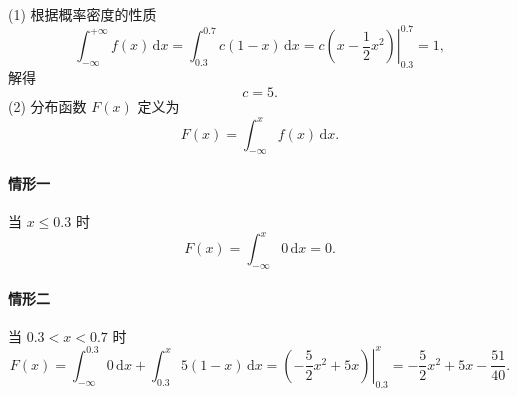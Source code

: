 \begin{solution}
    (1) 根据概率密度的性质
    $$
        \int_{-\infty}^{+\infty} f(x) \,\mathrm{d}x
        = \int_{0.3}^{0.7} c(1-x) \,\mathrm{d}x
        = \left.c\left(x-\frac{1}{2}x^2\right)\right|_{0.3}^{0.7}
        = 1,
    $$
    解得
    $$
        c = 5.
    $$
    (2) 分布函数 $F(x)$ 定义为
    $$
        F(x) = \int_{-\infty}^{x} f(x) \,\mathrm{d}x.
    $$
    \paragraph{情形一} 当 $x \leqslant 0.3$ 时
    $$
        F(x) = \int_{-\infty}^{x} 0 \,\mathrm{d}x = 0.
    $$
    \paragraph{情形二} 当 $0.3<x<0.7$ 时
    $$
        F(x) = \int_{-\infty}^{0.3} 0\,\mathrm{d}x + \int_{0.3}^x 5(1-x)\,\mathrm{d}x
        = \left.\left(-\frac{5}{2}x^2 + 5x\right)\right|_{0.3}^{x}
        = -\frac{5}{2}x^2 + 5x - \frac{51}{40}.
    $$

\end{solution}
